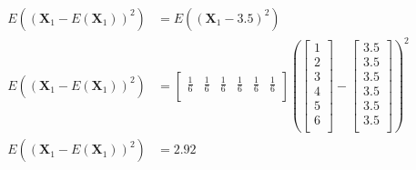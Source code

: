 \documentclass[12pt,letterpaper, onecolumn]{exam}
\begin{document}
\begin{questions}
\begin{parts}
{\begin{subparts}
						            \\
						            \solution
						            \begin{equation}
						                \begin{split}
						                    E\left((\mathbf{X}_1 - E(\mathbf{X}_1))^2\right) & = E\left((\mathbf{X}_1 - 3.5)^2\right)\\
						                    E\left((\mathbf{X}_1 - E(\mathbf{X}_1))^2\right) & =
						                    \begin{bmatrix}
						                        \frac{1}{6} & \frac{1}{6} & \frac{1}{6} & \frac{1}{6} & \frac{1}{6} & \frac{1}{6} \\
						                    \end{bmatrix}
						                    \left(
						                    \begin{bmatrix}
						                            1 \\
						                            2 \\
						                            3 \\
						                            4 \\
						                            5 \\
						                            6 \\
						                        \end{bmatrix} -
						                    \begin{bmatrix}
						                            3.5 \\
						                            3.5 \\
						                            3.5 \\
						                            3.5 \\
						                            3.5 \\
						                            3.5 \\
						                        \end{bmatrix}
						                    \right)^2\\
						                    E\left((\mathbf{X}_1 - E(\mathbf{X}_1))^2\right) & = 2.92\\
						                \end{split}
						            \end{equation}
						            \\

\end{subparts}}
\end{parts}
\end{questions}
\end{document}
